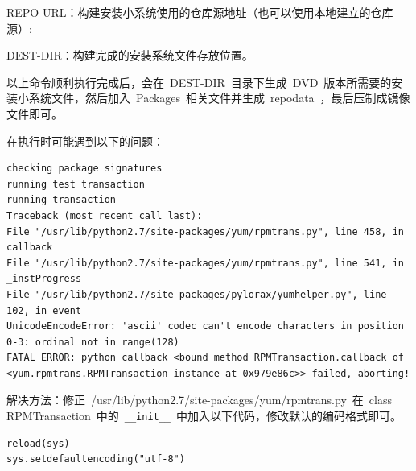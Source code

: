 \documentclass[a4paper]{ctexart}
\begin{document}
REPO-URL：构建安装小系统使用的仓库源地址（也可以使用本地建立的仓库源）;

DEST-DIR：构建完成的安装系统文件存放位置。

以上命令顺利执行完成后，会在~DEST-DIR~目录下生成~DVD~版本所需要的安装小系统文件，然后加入~Packages~相关文件并生成~repodata~，最后压制成镜像文件即可。

在执行时可能遇到以下的问题：
\begin{lstlisting}
checking package signatures
running test transaction
running transaction
Traceback (most recent call last):
File "/usr/lib/python2.7/site-packages/yum/rpmtrans.py", line 458, in callback
File "/usr/lib/python2.7/site-packages/yum/rpmtrans.py", line 541, in _instProgress
File "/usr/lib/python2.7/site-packages/pylorax/yumhelper.py", line 102, in event
UnicodeEncodeError: 'ascii' codec can't encode characters in position 0-3: ordinal not in range(128)
FATAL ERROR: python callback <bound method RPMTransaction.callback of <yum.rpmtrans.RPMTransaction instance at 0x979e86c>> failed, aborting! 
\end{lstlisting}

解决方法：修正~/usr/lib/python2.7/site-packages/yum/rpmtrans.py~在~class RPMTransaction~中的~\verb|__init__|~中加入以下代码，修改默认的编码格式即可。

\begin{lstlisting}
reload(sys)
sys.setdefaultencoding("utf-8")
\end{lstlisting}
\end{document}
